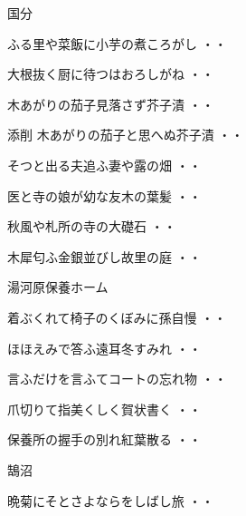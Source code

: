 \vspace{0.6cm}
国分
\begin{shiika}ふる里や菜飯に小芋の煮ころがし
\hfill{・・}\end{shiika}
\begin{shiika}大根抜く厨に待つはおろしがね
\hfill{・・}\end{shiika}
\begin{shiika}木あがりの茄子見落さず芥子漬
\hfill{・・}\end{shiika}
\begin{shiika}添削 木あがりの茄子と思へぬ芥子漬
\hfill{・・}\end{shiika}
\begin{shiika}そつと出る夫追ふ妻や露の畑
\hfill{・・}\end{shiika}
\begin{shiika}医と寺の娘が幼な友木の葉髪
\hfill{・・}\end{shiika}
\begin{shiika}秋風や札所の寺の大礎石
\hfill{・・}\end{shiika}
\begin{shiika}木犀匂ふ金銀並びし故里の庭
\hfill{・・}\end{shiika}
\vspace{0.6cm}
湯河原保養ホーム
\begin{shiika}着ぶくれて椅子のくぼみに孫自慢
\hfill{・・}\end{shiika}
\begin{shiika}ほほえみで答ふ遠耳冬すみれ
\hfill{・・}\end{shiika}
\begin{shiika}言ふだけを言ふてコートの忘れ物
\hfill{・・}\end{shiika}
\begin{shiika}爪切りて指美くしく賀状書く
\hfill{・・}\end{shiika}
\begin{shiika}保養所の握手の別れ紅葉散る
\hfill{・・}\end{shiika}
\vspace{0.6cm}
鵠沼
\begin{shiika}晩菊にそとさよならをしばし旅
\hfill{・・}\end{shiika}
